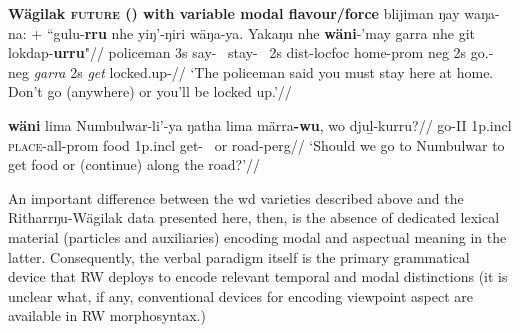 \pex \textbf{Wägilak \textsc{future} (\II) with variable modal flavour/force}
\a \begingl\gla {}blijiman ŋay waŋa-na: + ``gulu-\textbf{rru} nhe yiŋ'-ŋiri wäŋa-ya. Yakaŋu nhe \textbf{wäni}-'may garra nhe git lokdap-\textbf{urru}"//
\glb policeman 3s say-\III~ stay-\II~ 2s \gls{dist}-\gls{loc}\textdblhyphen\gls{foc} home-\gls{prom} \gls{neg} 2s go.\II-\gls{neg} \textit{garra} 2s \textit{get} locked.up-\II//
\glft`The policeman said you must stay here at home. Don't go (anywhere) or you'll be locked up.'\trailingcitation{[RŊ~20190520~18']}//
\endgl

\a\begingl\gla \textbf{wäni} lima Numbulwar-li'-ya ŋatha lima märra\textbf{-wu}, wo djuḻ-kurru?//
\glb go-\gls{II} 1p.\gls{incl} \textsc{place}-\gls{all}-\gls{prom} food 1p.\gls{incl} get-\II~ or road-\gls{perg}//
\glft`Should we go to Numbulwar to get food or (continue) along the road?'\trailingcitation{[PW~20190520~25']}//\endgl

\xe

An important difference between the \gls{wd} varieties described above and the Ritharrŋu-Wägilak data presented here, then, is the absence of dedicated lexical material (particles and auxiliaries) encoding modal and aspectual meaning in the latter. Consequently, the verbal paradigm itself is the primary grammatical device that RW deploys to encode relevant temporal and modal distinctions (it is unclear what, if any, conventional devices for encoding viewpoint aspect are available in RW morphosyntax.)


%
%

